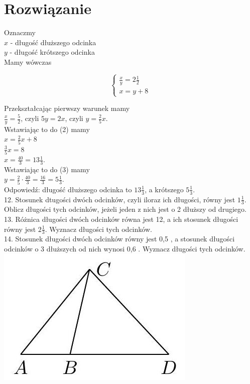 \documentclass[10pt]{article}
\begin{document}
\section*{Rozwiązanie}
Oznaczmy\\
\(x\) - długość dłuższego odcinka\\
\(y\) - długość krótszego odcinka\\
Mamy wówczas

\[
\left\{\begin{array}{l}
\frac{x}{y}=2 \frac{1}{2} \\
x=y+8
\end{array}\right.
\]

Przekształcając pierwszy warunek mamy\\
\(\frac{x}{y}=\frac{5}{2}\), czyli \(5 y=2 x\), czyli \(y=\frac{2}{5} x\).\\
Wstawiając to do (2) mamy\\
\(x=\frac{2}{5} x+8\)\\
\(\frac{3}{5} x=8\)\\
\(x=\frac{40}{3}=13 \frac{1}{3}\).\\
Wstawiając to do (3) mamy\\
\(y=\frac{2}{5} \cdot \frac{40}{3}=\frac{16}{3}=5 \frac{1}{3}\).\\
Odpowiedź: długość dłuższego odcinka to \(13 \frac{1}{3}\), a krótszego \(5 \frac{1}{3}\).\\
12. Stosunek dtugości dwóch odcinków, czyli iloraz ich długości, równy jest \(1 \frac{1}{3}\). Oblicz długości tych odcinków, jeżeli jeden z nich jest o 2 dłuższy od drugiego.\\
13. Różnica długości dwóch odcinków równa jest 12, a ich stosunek długości równy jest \(2 \frac{1}{3}\). Wyznacz długości tych odcinków.\\
14. Stosunek długości dwóch odcinków równy jest 0,5 , a stosunek długości odcinków o 3 dłuższych od nich wynosi 0,6 . Wyznacz długości tych odcinków.\\
\includegraphics[max width=\textwidth, center]{2024_11_21_71f62bd117d375398909g-034(1)}\\
\end{document}
